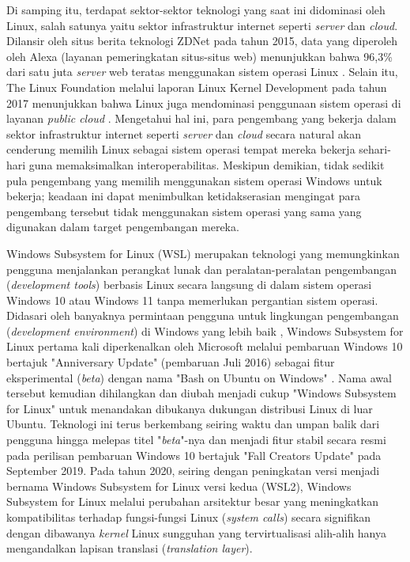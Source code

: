 Di samping itu, terdapat sektor-sektor teknologi yang saat ini didominasi oleh Linux, salah satunya yaitu sektor infrastruktur internet seperti \textit{server} dan \textit{cloud}. Dilansir oleh situs berita teknologi ZDNet pada tahun 2015, data yang diperoleh oleh Alexa (layanan pemeringkatan situs-situs web) menunjukkan bahwa 96,3\% dari satu juta \textit{server} web teratas menggunakan sistem operasi Linux \cite{zdnet-alexa-website-ranking-linux-dominance}. Selain itu, The Linux Foundation melalui laporan Linux Kernel Development pada tahun 2017 menunjukkan bahwa Linux juga mendominasi penggunaan sistem operasi di layanan \textit{public cloud} \cite{linux-dominance-on-public-cloud}. Mengetahui hal ini, para pengembang yang bekerja dalam sektor infrastruktur internet seperti \textit{server} dan \textit{cloud} secara natural akan cenderung memilih Linux sebagai sistem operasi tempat mereka bekerja sehari-hari guna memaksimalkan interoperabilitas. Meskipun demikian, tidak sedikit pula pengembang yang memilih menggunakan sistem operasi Windows untuk bekerja; keadaan ini dapat menimbulkan ketidakserasian mengingat para pengembang tersebut tidak menggunakan sistem operasi yang sama yang digunakan dalam target pengembangan mereka.

Windows Subsystem for Linux (WSL) merupakan teknologi yang memungkinkan pengguna menjalankan perangkat lunak dan peralatan-peralatan pengembangan (\textit{development tools}) berbasis Linux secara langsung di dalam sistem operasi Windows 10 atau Windows 11 tanpa memerlukan pergantian sistem operasi. Didasari oleh banyaknya permintaan pengguna untuk lingkungan pengembangan (\textit{development environment}) di Windows yang lebih baik \cite{some-background-on-why-bouow-was-planned}, Windows Subsystem for Linux pertama kali diperkenalkan oleh Microsoft melalui pembaruan Windows 10 bertajuk "Anniversary Update" (pembaruan Juli 2016) sebagai fitur eksperimental (\textit{beta}) dengan nama "Bash on Ubuntu on Windows" \cite{bouow-release-article}. Nama awal tersebut kemudian dihilangkan dan diubah menjadi cukup "Windows Subsystem for Linux" untuk menandakan dibukanya dukungan distribusi Linux di luar Ubuntu. Teknologi ini terus berkembang seiring waktu dan umpan balik dari pengguna hingga melepas titel "\textit{beta}"-nya dan menjadi fitur stabil secara resmi pada perilisan pembaruan Windows 10 bertajuk "Fall Creators Update" pada September 2019. Pada tahun 2020, seiring dengan peningkatan versi menjadi bernama Windows Subsystem for Linux versi kedua (WSL2), Windows Subsystem for Linux melalui perubahan arsitektur besar yang meningkatkan kompatibilitas terhadap fungsi-fungsi Linux (\textit{system calls}) secara signifikan dengan dibawanya \textit{kernel} Linux sungguhan yang tervirtualisasi alih-alih hanya mengandalkan lapisan translasi (\textit{translation layer}).

